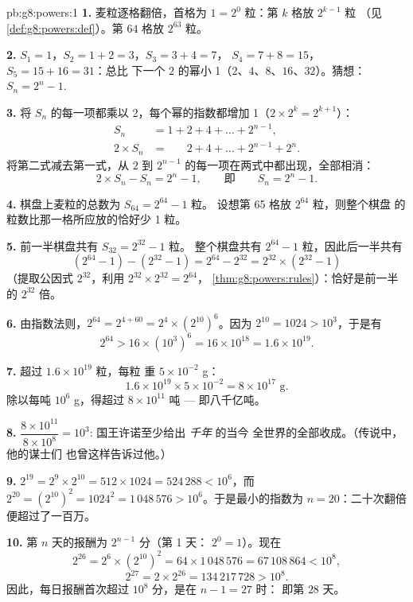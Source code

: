 \begin{solution}{pb:g8:powers:1}
\textbf{1.} 麦粒逐格翻倍，首格为
$1 = 2^0$ 粒：第 $k$ 格放 $2^{k-1}$ 粒
（见\cref{def:g8:powers:def}）。第 $64$ 格放 $2^{63}$ 粒。

\textbf{2.} $S_1 = 1$，$S_2 = 1 + 2 = 3$，$S_3 = 3 + 4 = 7$，
$S_4 = 7 + 8 = 15$，$S_5 = 15 + 16 = 31$：总比
下一个 $2$ 的幂小 1（$2$、$4$、$8$、$16$、$32$）。猜想：
$S_n = 2^n - 1$.

\textbf{3.} 将 $S_n$ 的每一项都乘以 2，每个幂的指数都增加
1（$2 \times 2^{k} = 2^{k+1}$）：
\begin{align*}
S_n &= 1 + 2 + 4 + \dots + 2^{n-1}, \\
2 \times S_n &= \phantom{1 + {}} 2 + 4 + \dots + 2^{n-1} + 2^n .
\end{align*}
将第二式减去第一式，从 $2$
到 $2^{n-1}$ 的每一项在两式中都出现，全部相消：
\[
2 \times S_n - S_n = 2^n - 1,
\qquad\text{即}\qquad
S_n = 2^n - 1 .
\]

\textbf{4.} 棋盘上麦粒的总数为 $S_{64} = 2^{64} - 1$ 粒。
设想第 65 格放 $2^{64}$ 粒，则整个棋盘
的粒数比那一格所应放的恰好少 1 粒。

\textbf{5.} 前一半棋盘共有 $S_{32} = 2^{32} - 1$ 粒。
整个棋盘共有 $2^{64} - 1$ 粒，因此后一半共有
\[
\left(2^{64} - 1\right) - \left(2^{32} - 1\right)
= 2^{64} - 2^{32}
= 2^{32} \times \left(2^{32} - 1\right)
\]
（提取公因式 $2^{32}$，利用 $2^{32} \times 2^{32} = 2^{64}$，
\cref{thm:g8:powers:rules}）：恰好是前一半的 $2^{32}$
倍。

\textbf{6.} 由指数法则，$2^{64} = 2^{4 + 60} =
2^4 \times \left(2^{10}\right)^6$。因为 $2^{10} = 1024 > 10^3$，于是有
\[
2^{64} > 16 \times \left(10^3\right)^6 = 16 \times 10^{18}
= 1.6 \times 10^{19} .
\]

\textbf{7.} 超过 $1.6 \times 10^{19}$ 粒，每粒
重 $5 \times 10^{-2}$ g：
\[
1.6 \times 10^{19} \times 5 \times 10^{-2}
= 8 \times 10^{17} \text{ g} .
\]
除以每吨 $10^6$ g，得超过 $8 \times 10^{11}$
吨 --- 即八千亿吨。

\textbf{8.} $\dfrac{8 \times 10^{11}}{8 \times 10^{8}} = 10^3$:
国王许诺至少给出 \emph{千年} 的当今
全世界的全部收成。（传说中，他的谋士们
也曾这样告诉过他。）

\textbf{9.} $2^{19} = 2^9 \times 2^{10} = 512 \times 1024 =
524\,288 < 10^6$，而 $2^{20} = \left(2^{10}\right)^2 =
1024^2 = 1\,048\,576 > 10^6$。于是最小的指数为
$n = 20$：二十次翻倍便超过了一百万。

\textbf{10.} 第 $n$ 天的报酬为 $2^{n-1}$ 分（第 1 天：
$2^0 = 1$）。现在
\[
2^{26} = 2^6 \times \left(2^{10}\right)^2
= 64 \times 1\,048\,576 = 67\,108\,864 < 10^8,
\]
\[
2^{27} = 2 \times 2^{26} = 134\,217\,728 > 10^8 .
\]
因此，每日报酬首次超过 $10^8$ 分，是在 $n - 1 = 27$ 时：
即第 $28$ 天。


\end{solution}
